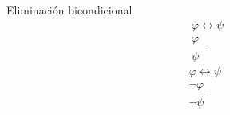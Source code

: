 \begin{ruleinf} \label{relinf_equivdel} Eliminación bicondicional
	\begin{equation}
	\begin{gathered}
		\varphi \leftrightarrow \psi  \\
		\underline {\varphi \quad \quad } \\
		\psi 
	\end{gathered}
	\end{equation}
	\begin{equation}
	\begin{gathered}
		\varphi \leftrightarrow \psi \\
		\underline {\lnot \varphi \quad \quad } \\
		\lnot \psi 
	\end{gathered}
\end{equation}
\end{ruleinf}
